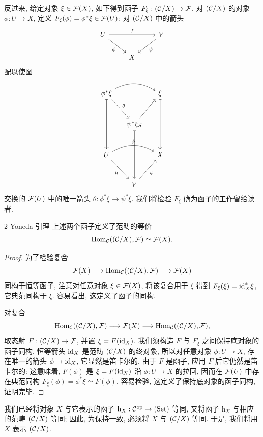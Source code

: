 反过来, 给定对象 $\xi\in\mathcal F(X)$, 如下得到函子 $F_\xi:(\mathcal C/X)\to\mathcal F$. 对 $(\mathcal C/X)$ 的对象 $\phi:U\to X$, 定义 $F_\xi(\phi)=\phi^*\xi\in\mathcal F(U)$; 对 $(\mathcal C/X)$ 中的箭头
\[
\begin{tikzcd}
U\arrow[rr,"{f}"]\arrow[dr,"{\phi}"']&&V\arrow[dl,"{\psi}"]\\
&X&
\end{tikzcd}
\]
配以使图
\[
\begin{tikzcd}[column sep=small,row sep=large]
\phi^*\xi\arrow[rr,bend left]\arrow[dr,dashed,"{\theta}"]\arrow[dd,mapsto]&&\xi\arrow[dd,mapsto]\\
&\psi^*\xi_S\arrow[ur]\arrow[dd,mapsto]&\\
U\arrow[rr,bend left,"{\phi}"]\arrow[dr,"{h}"']&&X\\
&V\arrow[ur,"{\psi}"']&
\end{tikzcd}
\]
交换的 $\mathcal F(U)$ 中的唯一箭头 $\theta:\phi^*\xi\to\psi^*\xi$. 我们将检验 $F_\xi$ 确为函子的工作留给读者.

\begin{origstatement}{$2$-Yoneda 引理}{}\label{ch03:2yoneda}
上述两个函子定义了范畴的等价
\[
\operatorname{Hom}_{\mathcal C}((\mathcal C/X),\mathcal F)\simeq\mathcal F(X).
\]
\end{origstatement}
\begin{proof}
为了检验复合
\[
\mathcal F(X)\longrightarrow\operatorname{Hom}_{\mathcal C}((\mathcal C/X),\mathcal F)\longrightarrow\mathcal F(X)
\]
同构于恒等函子, 注意对任意对象 $\xi\in\mathcal F(X)$, 将该复合用于 $\xi$ 得到 $F_\xi(\xi)=\mathrm{id}_X^*\xi$, 它典范同构于 $\xi$. 容易看出, 这定义了函子的同构.

对复合
\[
\operatorname{Hom}_{\mathcal C}((\mathcal C/X),\mathcal F)\longrightarrow\mathcal F(X)\longrightarrow\operatorname{Hom}_{\mathcal C}((\mathcal C/X),\mathcal F),
\]
取态射 $F:(\mathcal C/X)\to\mathcal F$, 并置 $\xi=F(\mathrm{id}_X)$. 我们须构造 $F$ 与 $F_\xi$ 之间保持底对象的函子同构. 恒等箭头 $\mathrm{id}_X$ 是范畴 $(\mathcal C/X)$ 的终对象, 所以对任意对象 $\phi:U\to X$, 存在唯一的箭头 $\phi\to\mathrm{id}_X$, 它显然是笛卡尔的. 由于 $F$ 是函子, 应用 $F$ 后它仍然是笛卡尔的: 这意味着, $F(\phi)$ 是 $\xi=F(\mathrm{id}_X)$ 沿 $\phi:U\to X$ 的拉回, 因而在 $\mathcal F(U)$ 中存在典范同构 $F_\xi(\phi)=\phi^*\xi\simeq F(\phi)$. 容易检验, 这定义了保持底对象的函子同构, 证明完毕.
\end{proof}

我们已经将对象 $X$ 与它表示的函子 $\mathrm h_X:\mathcal C^{\mathrm{op}}\to(\mathrm{Set})$ 等同, 又将函子 $\mathrm h_X$ 与相应的范畴 $(\mathcal C/X)$ 等同; 因此, 为保持一致, 必须将 $X$ 与 $(\mathcal C/X)$ 等同. 于是, 我们将用 $X$ 表示 $(\mathcal C/X)$.

